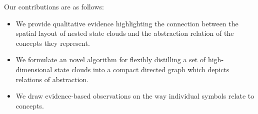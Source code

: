 Our contributions are as follows:

\begin{itemize}
    \item We provide qualitative evidence highlighting the connection between the spatial layout of nested state clouds and the abstraction relation of the concepts they represent.
    \item We formulate an novel algorithm for flexibly distilling a set of high-dimensional state clouds into a compact directed graph which depicts relations of abstraction.
    \item We draw evidence-based observations on the way individual symbols relate to concepts.
\end{itemize}